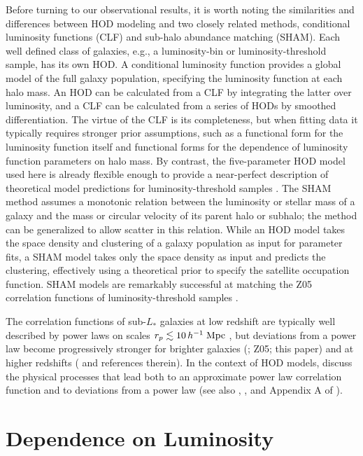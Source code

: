 \documentclass[]{emulateapj}
\newcommand{\hmpc}{\,h^{-1}\;{\rm Mpc}}
\begin{document}
Before turning to our observational results, it is worth noting the 
similarities and differences between HOD modeling and two closely related
methods, conditional luminosity functions (CLF) and 
sub-halo abundance matching (SHAM).
Each well defined class of galaxies, e.g., a luminosity-bin or
luminosity-threshold sample, has its own HOD.  A conditional
luminosity function \citep{yang03} provides a global
model of the full galaxy population, specifying the luminosity
function at each halo mass.  An HOD can be calculated from a CLF
by integrating the latter over luminosity, and a CLF can be calculated
from a series of HODs by smoothed differentiation.
The virtue of the CLF is its completeness, but when fitting 
data it typically requires stronger prior assumptions,
such as a functional form for the luminosity function itself and
functional forms for the dependence of luminosity function parameters
on halo mass.  By contrast, the five-parameter HOD model used
here is already flexible enough to provide a near-perfect description
of theoretical model predictions for luminosity-threshold samples
\citep{zheng05}.  The SHAM method \citep{conroy06,vale06}
assumes a monotonic relation between the luminosity or stellar mass
of a galaxy and the mass or circular velocity of its parent
halo or subhalo; the method can be generalized to allow scatter
in this relation.  While an HOD model takes the space density
and clustering of a galaxy population as input for parameter fits, 
a SHAM model takes only the space density as input and predicts the 
clustering, effectively using a theoretical prior to specify the
satellite occupation function.  
SHAM models are remarkably successful at matching the Z05 
correlation functions of luminosity-threshold samples
\citep{conroy06}.

The correlation functions of sub-$L_*$ galaxies at low redshift
are typically well described by power laws on scales $r_p \la 10\hmpc$
\citep{totsuji69,peebles74,gott79}, but deviations from a power
law become progressively stronger for brighter galaxies
(\citealt{zehavi04}; Z05; this paper) and at higher redshifts
(\citealt{conroy06} and references therein).
In the context of HOD models,
\cite{watson11} discuss the physical processes that lead both
to an approximate power law correlation function and to 
deviations from a power law (see also \citealt{benson00},
\citealt{berlind02}, and Appendix A of \citealt{zheng09}).

\section{Dependence on Luminosity}
\label{sec:lum}
\end{document}
